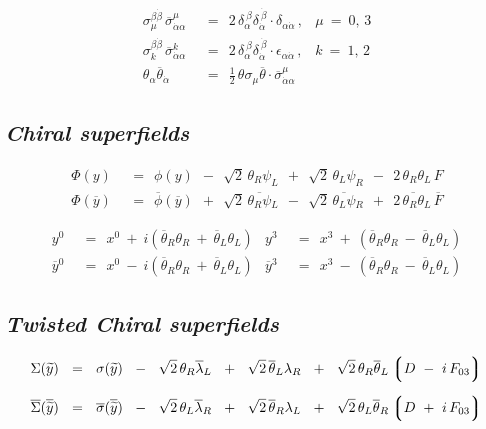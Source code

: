 \documentclass[14pt]{article}
\newcommand{\wt}{\widetilde}
\newcommand{\ov}{\overline}
\newcommand{\lgr}{\left\lgroup}
\newcommand{\rgr}{\right\rgroup}
\begin{document}
\begin{align*}
	\sigma_\mu^{\beta\dot\beta}\, \ov\sigma_{\dot\alpha\alpha}^\mu & ~~=~~ 
					2\, \delta_\alpha^{\ \beta} \delta_{\dot\alpha}^{\ \dot\beta} \cdot
						\delta_{\alpha\dot\alpha}\,,
	&
	\mu ~=~ 0,\, 3 
	\\[2mm]
	\sigma_k^{\beta\dot\beta}\, \ov\sigma_{\dot\alpha\alpha}^k & ~~=~~
					2\, \delta_\alpha^{\ \beta} \delta_{\dot\alpha}^{\ \dot\beta} \cdot
						\epsilon_{\alpha\dot\alpha}\,,
	&
	k ~=~ 1,\, 2 
	\\[1mm]
	\theta_\alpha \ov\theta_{\dot\alpha} & ~~=~~ 
		\frac{1}{2}\, \theta\sigma_\mu\ov{\theta} \cdot \ov{\sigma}_{\dot\alpha\alpha}^\mu
\end{align*}


\pagebreak
\subsection*{\centering\it Chiral superfields}
\begin{align*}
	\Phi(y)    & ~~=~~    \phi(y)  ~~-~~  \sqrt{2}\, \theta_R \psi_L
                                       ~~+~~  \sqrt{2}\, \theta_L \psi_R  ~~-~~  2\, \theta_R\theta_L\, F
	\\[2mm]
	\Phi(\ov y)    & ~~=~~    \ov\phi(\ov y)  ~~+~~  \sqrt{2}\, \ov{\theta_R \psi}{}_L
                                                  ~~-~~  \sqrt{2}\, \ov{\theta_L \psi}{}_R
                                                  ~~+~~  2\, \ov{\theta_R \theta}{}_L\, \ov{F}
\end{align*}

\begin{align*}
	y^0    & ~~=~~  x^0  ~+~ i \left( \ov\theta{}_R\theta_R  ~+~  \ov\theta{}_L\theta_L \right)
	&
	y^3    & ~~=~~  x^3  ~+~ \left( \ov\theta{}_R\theta_R  ~-~  \ov\theta{}_L\theta_L \right)
	\\[2mm]
	\ov y{}^0    & ~~=~~   x^0  ~-~ i \left( \ov\theta{}_R\theta_R  ~+~  \ov\theta{}_L\theta_L \right)
	&
	\ov y{}^3    & ~~=~~   x^3  ~-~ \left( \ov\theta{}_R\theta_R  ~-~  \ov\theta{}_L\theta_L \right)
\end{align*}

\vspace{2mm}
\subsection*{\centering \it Twisted Chiral superfields}
\begin{align*}
	\Sigma(\wt y)    & ~~=~~    \sigma(\wt y)  ~~-~~  \sqrt{2}\, \theta_R \ov\lambda{}_L
						   ~~+~~  \sqrt{2}\, \ov\theta{}_L \lambda_R
						   ~~+~~  \sqrt{2}\, \theta_R \ov\theta{}_L \lgr D ~-~ i\, F_{03} \rgr
	\\[2mm]
	\ov\Sigma(\ov{\wt y})    & ~~=~~    \ov\sigma(\ov{\wt y})  ~~-~~ \sqrt{2}\, \theta_L \ov\lambda{}_R
								   ~~+~~ \sqrt{2}\, \ov\theta{}_R \lambda_L
								   ~~+~~ \sqrt{2}\, \theta_L \ov\theta{}_R \lgr D ~+~ i\, F_{03} \rgr
\end{align*}
\end{document}
